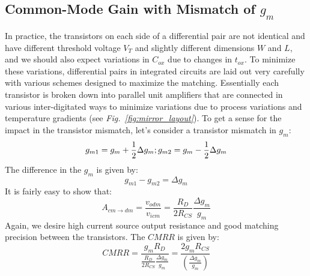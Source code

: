 \subsection{Common-Mode Gain with Mismatch of \texorpdfstring{$g_m$}{Transconductance}}
In practice, the transistors on each side of a differential pair are not identical and have different threshold voltage $V_T$ and slightly different dimensions $W$ and $L$, and we should also expect variations in $C_{ox}$ due to changes in $t_{ox}$.  To minimize these variations, differential pairs in integrated circuits are laid out very carefully with various schemes designed to maximize the matching.  Essentially each transistor is broken down into parallel unit amplifiers that are connected in various inter-digitated ways to minimize variations due to process variations and temperature gradients (see \emph{Fig.~\ref{fig:mirror_layout}}).
To get a sense for the impact in the transistor mismatch, let's consider a transistor mismatch in $g_m$:
    \begin{equation} 
        {g_{m1}} = {g_m} + \frac{1}{2}\Delta {g_m};{\rm{         }}{g_{m2}} = {g_m} - \frac{1}{2}\Delta {g_m}
    \end{equation}
The difference in the $g_m$ is given by:
    \begin{equation}
        {g_{m1}} - {g_{m2}} = \Delta {g_m}
    \end{equation}
It is fairly easy to show that:
    \begin{equation}
        {A_{cm \to dm }} = \frac{{{v_{odm}}}}{{{v_{icm}}}} = \frac{{{R_D}}}{{2{R_{CS}}}}\frac{{\Delta {g_m}}}{{{g_m}}}
    \end{equation}
Again, we desire high current source output resistance and good matching precision between the transistors.  The $CMRR$ is given by:
    \begin{equation}
        CMRR  =  \frac{{{g_m}{R_D}}}{{\frac{{{R_D}}}{{2{R_{CS}}}}\frac{{\Delta {g_m}}}{{{g_m}}}}} = \frac{{2{g_m}{R_{CS}}}}{{\left( {\frac{{\Delta {g_m}}}{{{g_m}}}} \right)}} 
    \end{equation}
